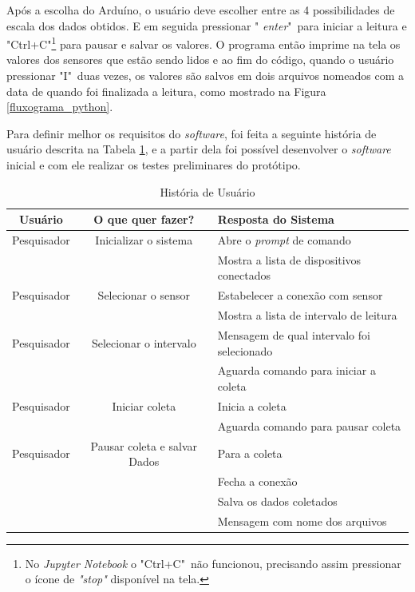 		Após a escolha do Arduíno, o usuário deve escolher entre as 4 possibilidades de escala dos dados obtidos. E em seguida pressionar " \textit{enter}"\ para iniciar a leitura e "Ctrl+C"\footnote{No \textit{Jupyter Notebook} o "Ctrl+C"\ não funcionou, precisando assim pressionar o ícone de \textit{"stop"} disponível na tela.} para pausar e salvar os valores. O programa então imprime na tela os valores dos sensores que estão sendo lidos e ao fim do código, quando o usuário pressionar "I"\ duas vezes, os valores são salvos em dois arquivos nomeados com a data de quando foi finalizada a leitura, como mostrado na Figura \ref{fluxograma_python}.
		
		Para definir melhor os requisitos do \textit{software}, foi feita a seguinte história de usuário descrita na Tabela \ref{User_story}, e a partir dela foi possível desenvolver o \textit{software} inicial e com ele realizar os testes preliminares do protótipo.
		
			\begin{table}[h!] \footnotesize
			\centering
			\caption{História de Usuário}
			\label{User_story}
			
			\begin{tabular}{ccl}
				\toprule
				\textbf{Usuário} & \textbf{O que quer fazer?} & \textbf{Resposta do Sistema} \\
				\midrule
				Pesquisador & Inicializar o sistema &  Abre o \textit{prompt} de comando \\
				 & & Mostra a lista de dispositivos conectados \\
				Pesquisador & Selecionar o sensor & Estabelecer a conexão com sensor \\
				& & Mostra a lista de intervalo de leitura\\
				Pesquisador & Selecionar o intervalo & Mensagem de qual intervalo foi selecionado\\
				& & Aguarda comando para iniciar a coleta\\
				Pesquisador & Iniciar coleta & Inicia a coleta\\
				& &  Aguarda comando para pausar coleta\\
				Pesquisador & Pausar coleta e salvar Dados & Para a coleta\\
				& & Fecha a conexão\\
				& & Salva os dados coletados\\
				& & Mensagem com nome dos arquivos\\  
 				
				\bottomrule
			\end{tabular}
		\end{table}
		
